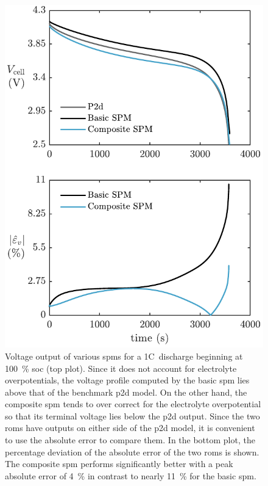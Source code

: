 \begin{figure}[!htbp]
    \centering
    \includegraphics{chapters/sys_id/figures/composite_spm_vcell_1C.pdf}
    \caption[%
    Comparison  of  terminal  voltages  of  composite  ,  basic
     and the  model for a 1C~discharge
    ]%
    {%
        Voltage output  of various \glspl{spm}  for a 1C~discharge  beginning at
        \SI{100}{\percent} \gls{soc} (top  plot). Since it does  not account for
        electrolyte overpotentials,  the voltage  profile computed by  the basic
        \gls{spm} lies above that of the benchmark \gls{p2d} model. On the other
        hand, the composite \gls{spm} tends  to over correct for the electrolyte
        overpotential  so that  its terminal  voltage lies  below the  \gls{p2d}
        output. Since  the two \glspl{rom}  have outputs  on either side  of the
        \gls{p2d}  model,  it  is  convenient  to  use  the  absolute  error  to
        compare  them. In  the  bottom  plot, the  percentage  deviation of  the
        absolute error of the two  \glspl{rom} is shown. The composite \gls{spm}
        performs  significantly better  with a  peak absolute  error of  \approx
        \SI{4}{\percent} in  contrast to nearly \SI{11}{\percent}  for the basic
        \gls{spm}.
    }%
    \label{fig:voltageoutputcompareallSPMs1C}
\end{figure}

